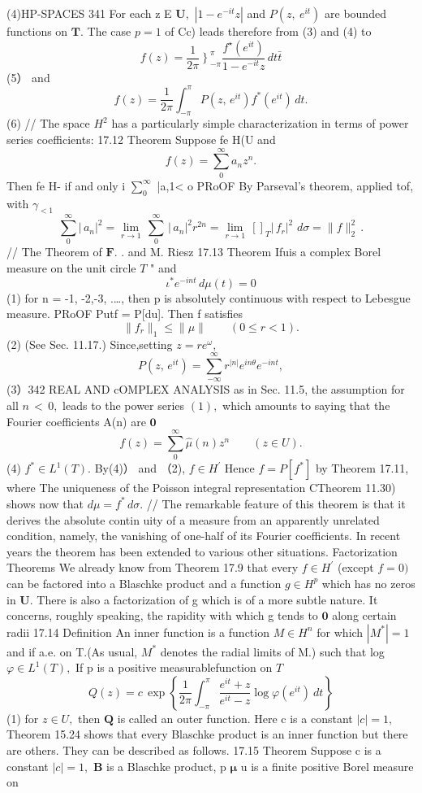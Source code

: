 (4)HP-SPACES 341 For each z E ${\boldsymbol{U}},$ $|1-e^{-i t}z|$ and $P(z,\ e^{i t})$ are bounded functions on ${\boldsymbol{T}}.$ The case $\scriptstyle{p=1}$ of Cc) leads therefore from (3) and (4) to $$ f(z)={\frac{1}{2\pi}}\left.\right\}_{-\pi}^{\pi}{\frac{f^{\star}(e^{i t})}{1-e^{-i t}z}}\,d t\bar{t} $$ (5） and $$ f(z)={\frac{1}{2\pi}}\int_{-\pi}^{\pi}P(z,\,e^{i t})f^{*}(e^{i t})\,d t. $$ (6) // The space $H^{2}$ has a particularly simple characterization in terms of power series coefficients: 17.12 Theorem Suppose fe H(U and $$ f(z)=\sum_{0}^{\infty}a_{n}z^{n}. $$ Then fe H- if and only i $\sum_{0}^{\infty}$ |a,1< o PRoOF By Parseval's theorem, applied tof, with $\gamma_{<1}$ $$ \sum_{0}^{\infty}|\,a_{n}|^{2}=\operatorname*{lim}_{r\to1}\,\sum_{0}^{\infty}\,|\,a_{n}|^{2}r^{2n}=\operatorname*{lim}_{r\to1}\,\left[\right]_{T}|\,f_{r}|^{2}\,\,d\sigma=\|f\|_{2}^{2}\,. $$ // The Theorem of $\mathbf{F}.$ . and M. Riesz 17.13 Theorem Ifuis a complex Borel measure on the unit circle ${\mathbf{}}T$ " and $$ \iota^{*}e^{-i n t}\,d\mu(t)=0 $$ (1) for n = -1, -2,-3, .…, then p is absolutely continuous with respect to Lebesgue measure. PRoOF Putf = P[du]. Then f satisfies $$ \|f_{r}\|_{1}\leq\|\mu\|\qquad(0\leq r<1). $$ (2) (See Sec. 11.17.) Since,setting $z=r e^{\omega},$ $$ P(z,\,e^{i t})=\sum_{-\infty}^{\infty}r^{|n|}e^{i n\theta}e^{-i n t}, $$ (3）342 REAL AND cOMPLEX ANALYSIS as in Sec. 11.5, the assumption for all $\scriptstyle n\,<\,0,$ leads to the power series $(1),$ which amounts to saying that the Fourier coefficients A(n) are $\mathbf{0}$ $$ f(z)=\sum_{0}^{\infty}\hat{\mu}(n)z^{n}\qquad(z\in U). $$ (4) $f^{*}\in L^{1}(T).$ By(4)） and （2), $\textstyle f\in H^{\prime}$ Hence $f=P[f^{*}]$ by Theorem 17.11, where The uniqueness of the Poisson integral representation CTheorem 11.30) shows now that $d\mu=f^{*}\,d\sigma.$ // The remarkable feature of this theorem is that it derives the absolute contin uity of a measure from an apparently unrelated condition, namely, the vanishing of one-half of its Fourier coefficients. In recent years the theorem has been extended to various other situations. Factorization Theorems We already know from Theorem 17.9 that every $\scriptstyle f\in H^{\prime}$ (except $f=0)$ can be factored into a Blaschke product and a function $g\in H^{p}$ which has no zeros in ${\boldsymbol{U}}.$ There is also a factorization of g which is of a more subtle nature. It concerns, roughly speaking, the rapidity with which g tends to $\mathbf{0}$ along certain radii 17.14 Definition An inner function is a function $M\in H^{n}$ for which $|M^{*}|=1$ and if a.e. on T.(As usual, $M^{*}$ denotes the radial limits of M.) such that log $\varphi\in L^{1}(T),$ If p is a positive measurablefunction on ${\mathbf{}}T$ $$ Q(z)=c\,\exp\left\{{\frac{1}{2\pi}}\int_{-\pi}^{\pi}{\frac{e^{i t}+z}{e^{i t}-z}}\log\varphi(e^{i t})\ d t\right\} $$ (1) for $z\in U,$ then ${\boldsymbol{Q}}$ is called an outer function. Here c is a constant $|c|=1,$ Theorem 15.24 shows that every Blaschke product is an inner function but there are others. They can be described as follows. 17.15 Theorem Suppose c is a constant $|c|=1,$ $\boldsymbol{B}$ is a Blaschke product, p ${\boldsymbol{\mu}}$ u is a finite positive Borel measure on 